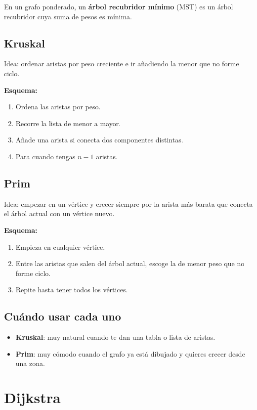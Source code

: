\documentclass[11pt,a4paper]{article}
\begin{document}
En un grafo ponderado, un \textbf{árbol recubridor mínimo} (MST) es un árbol recubridor cuya suma de pesos es mínima.

\subsection{Kruskal}
Idea: ordenar aristas por peso creciente e ir añadiendo la menor que no forme ciclo.

\textbf{Esquema:}
\begin{enumerate}
    \item Ordena las aristas por peso.
    \item Recorre la lista de menor a mayor.
    \item Añade una arista si conecta dos componentes distintas.
    \item Para cuando tengas $n-1$ aristas.
\end{enumerate}

\subsection{Prim}
Idea: empezar en un vértice y crecer siempre por la arista más barata que conecta el árbol actual con un vértice nuevo.

\textbf{Esquema:}
\begin{enumerate}
    \item Empieza en cualquier vértice.
    \item Entre las aristas que salen del árbol actual, escoge la de menor peso que no forme ciclo.
    \item Repite hasta tener todos los vértices.
\end{enumerate}

\subsection{Cuándo usar cada uno}
\begin{itemize}
    \item \textbf{Kruskal}: muy natural cuando te dan una tabla o lista de aristas.
    \item \textbf{Prim}: muy cómodo cuando el grafo ya está dibujado y quieres crecer desde una zona.
\end{itemize}

\section{Dijkstra}
\end{document}
